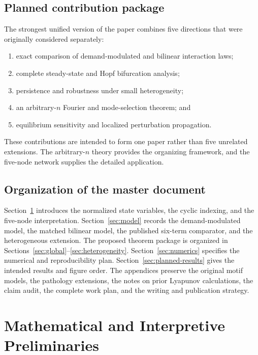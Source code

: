 \documentclass[11pt, reqno]{amsart}
\theoremstyle{definition}
\theoremstyle{remark}
\begin{document}
	\subsection{Planned contribution package}
	
	The strongest unified version of the paper combines five directions that were
	originally considered separately:
	
	\begin{enumerate}[label=(\roman*),leftmargin=2.5em]
		\item exact comparison of demand-modulated and bilinear interaction laws;
		\item complete steady-state and Hopf bifurcation analysis;
		\item persistence and robustness under small heterogeneity;
		\item an arbitrary-$n$ Fourier and mode-selection theorem; and
		\item equilibrium sensitivity and localized perturbation propagation.
	\end{enumerate}
	
	These contributions are intended to form one paper rather than five unrelated
	extensions.  The arbitrary-$n$ theory provides the organizing framework, and
	the five-node network supplies the detailed application.
	
	\subsection{Organization of the master document}
	
	Section~\ref{sec:preliminaries} introduces the normalized state variables, the
	cyclic indexing, and the five-node interpretation.  Section~\ref{sec:model}
	records the demand-modulated model, the matched bilinear model, the published
	six-term comparator, and the heterogeneous extension.  The proposed theorem
	package is organized in Sections~\ref{sec:global}--\ref{sec:heterogeneity}.
	Section~\ref{sec:numerics} specifies the numerical and reproducibility plan.
	Section~\ref{sec:planned-results} gives the intended results and figure order.
	The appendices preserve the original motif models, the pathology extensions,
	the notes on prior Lyapunov calculations, the claim audit, the complete work
	plan, and the writing and publication strategy.
	
	\section{Mathematical and Interpretive Preliminaries}
	\label{sec:preliminaries}
	
\end{document}
